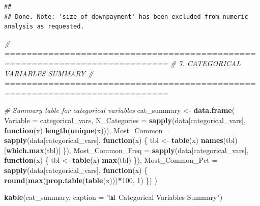 \documentclass[
]{article}
\newenvironment{Shaded}{\begin{snugshade}}{\end{snugshade}}
\newcommand{\AttributeTok}[1]{\textcolor[rgb]{0.13,0.29,0.53}{#1}}
\newcommand{\CommentTok}[1]{\textcolor[rgb]{0.56,0.35,0.01}{\textit{#1}}}
\newcommand{\ControlFlowTok}[1]{\textcolor[rgb]{0.13,0.29,0.53}{\textbf{#1}}}
\newcommand{\DecValTok}[1]{\textcolor[rgb]{0.00,0.00,0.81}{#1}}
\newcommand{\FunctionTok}[1]{\textcolor[rgb]{0.13,0.29,0.53}{\textbf{#1}}}
\newcommand{\NormalTok}[1]{#1}
\newcommand{\OtherTok}[1]{\textcolor[rgb]{0.56,0.35,0.01}{#1}}
\newcommand{\SpecialCharTok}[1]{\textcolor[rgb]{0.81,0.36,0.00}{\textbf{#1}}}
\newcommand{\StringTok}[1]{\textcolor[rgb]{0.31,0.60,0.02}{#1}}
\begin{document}
\begin{verbatim}
## 
## Done. Note: 'size_of_downpayment' has been excluded from numeric analysis as requested.
\end{verbatim}

\begin{Shaded}
\begin{Highlighting}[]
\CommentTok{\# ============================================================================}
\CommentTok{\# 7. CATEGORICAL VARIABLES SUMMARY}
\CommentTok{\# ============================================================================}

\CommentTok{\# Summary table for categorical variables}
\NormalTok{cat\_summary }\OtherTok{\textless{}{-}} \FunctionTok{data.frame}\NormalTok{(}
  \AttributeTok{Variable =}\NormalTok{ categorical\_vars,}
  \AttributeTok{N\_Categories =} \FunctionTok{sapply}\NormalTok{(data[categorical\_vars], }\ControlFlowTok{function}\NormalTok{(x) }\FunctionTok{length}\NormalTok{(}\FunctionTok{unique}\NormalTok{(x))),}
  \AttributeTok{Most\_Common =} \FunctionTok{sapply}\NormalTok{(data[categorical\_vars], }\ControlFlowTok{function}\NormalTok{(x) \{}
\NormalTok{    tbl }\OtherTok{\textless{}{-}} \FunctionTok{table}\NormalTok{(x)}
    \FunctionTok{names}\NormalTok{(tbl)[}\FunctionTok{which.max}\NormalTok{(tbl)]}
\NormalTok{  \}),}
  \AttributeTok{Most\_Common\_Freq =} \FunctionTok{sapply}\NormalTok{(data[categorical\_vars], }\ControlFlowTok{function}\NormalTok{(x) \{}
\NormalTok{    tbl }\OtherTok{\textless{}{-}} \FunctionTok{table}\NormalTok{(x)}
    \FunctionTok{max}\NormalTok{(tbl)}
\NormalTok{  \}),}
  \AttributeTok{Most\_Common\_Pct =} \FunctionTok{sapply}\NormalTok{(data[categorical\_vars], }\ControlFlowTok{function}\NormalTok{(x) \{}
    \FunctionTok{round}\NormalTok{(}\FunctionTok{max}\NormalTok{(}\FunctionTok{prop.table}\NormalTok{(}\FunctionTok{table}\NormalTok{(x)))}\SpecialCharTok{*}\DecValTok{100}\NormalTok{, }\DecValTok{1}\NormalTok{)}
\NormalTok{  \})}
\NormalTok{)}

\FunctionTok{kable}\NormalTok{(cat\_summary, }\AttributeTok{caption =} \StringTok{"📊 Categorical Variables Summary"}\NormalTok{)}
\end{Highlighting}
\end{Shaded}
\end{document}
